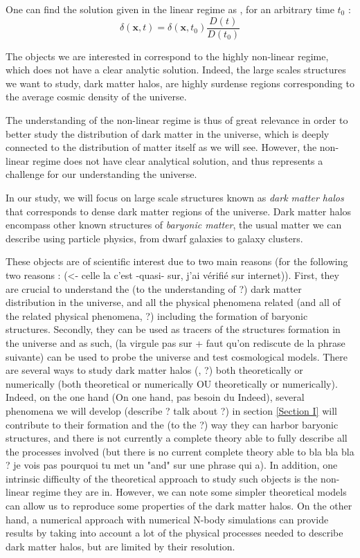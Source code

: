 One can find the solution given in the linear regime as \cite{LaC}, for an arbitrary time $t_0$ :
\begin{equation}
\label{linear}
\delta (\textbf{x}, t) = \delta (\textbf{x}, t_0) \frac{D(t)}{D(t_0)}
\end{equation}

The objects we are interested in correspond to the highly non-linear regime, which does not have a clear analytic solution. Indeed, the large scales structures we want to study, dark matter halos, are highly surdense regions corresponding to the average cosmic density of the universe. 

The understanding of the non-linear regime is thus of great relevance in order to better study the distribution of dark matter in the universe, which is deeply connected to the distribution of matter itself as we will see. However, the non-linear regime does not have clear analytical solution, and thus represents a challenge for our understanding the universe.


In our study, we will focus on large scale structures known as \textit{dark matter halos} that corresponds to dense dark matter regions of the universe. Dark matter halos encompass other known structures of \textit{baryonic matter}, the usual matter we can describe using particle physics, from dwarf galaxies to galaxy clusters.

These objects are of scientific interest due to two main reasons (for the following two reasons : (<- celle la c'est -quasi- sur, j'ai vérifié sur internet)). First, they are crucial to understand the (to the understanding of ?) dark matter distribution in the universe, and all  the physical phenomena related (and all of the related physical phenomena, ?) including the formation of baryonic structures. Secondly, they can be used as tracers of the structures formation in the universe and as such, (la virgule pas sur + faut qu'on rediscute de la phrase suivante) can be used to probe the universe and test cosmological models. There are several ways to study dark matter halos (, ?) both theoretically or numerically (both theoretical or numerically OU theoretically or numerically). Indeed, on the one hand (On one hand, pas besoin du Indeed), several phenomena we will develop (describe ? talk about ?) in section \ref{Section I} will contribute to their formation and the (to the ?) way they can harbor baryonic structures, and there is not currently a complete theory able to fully describe all the processes involved (but there is no current complete theory able to bla bla bla ? je vois pas pourquoi tu met un "and" sur une phrase qui a). In addition, one intrinsic difficulty of the theoretical approach to study such objects is the non-linear regime they are in. However, we can note some simpler theoretical models can allow us to reproduce some properties of the dark matter halos\cite{Zentner}. On the other hand, a numerical approach with numerical N-body simulations can provide results by taking into account a lot of the physical processes needed to describe dark matter halos, but are limited by their resolution.

